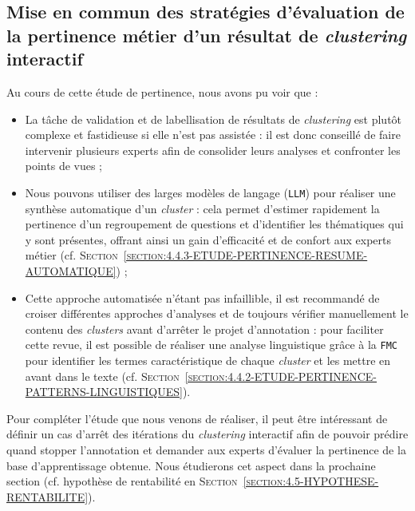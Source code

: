 		
	\subsection{Mise en commun des stratégies d'évaluation de la pertinence métier d'un résultat de \textit{clustering} interactif}
	\label{section:4.4.4-ETUDE-PERTINENCE-MISE-EN-COMMUN}
			
		\begin{leftBarSummary}
			Au cours de cette étude de pertinence, nous avons pu voir que :
			\begin{itemize}
				\item[\itemok] La tâche de validation et de labellisation de résultats de \textit{clustering} est plutôt complexe et fastidieuse si elle n'est pas assistée : il est donc conseillé de faire intervenir plusieurs experts afin de consolider leurs analyses et confronter les points de vues ;
				\item[\itemok] Nous pouvons utiliser des larges modèles de langage (\texttt{LLM}) pour réaliser une synthèse automatique d'un \textit{cluster} : cela permet d'estimer rapidement la pertinence d'un regroupement de questions et d'identifier les thématiques qui y sont présentes, offrant ainsi un gain d'efficacité et de confort aux experts métier (cf. \textsc{Section~\ref{section:4.4.3-ETUDE-PERTINENCE-RESUME-AUTOMATIQUE}}) ;
				\item[\itemok] Cette approche automatisée n'étant pas infaillible, il est recommandé de croiser différentes approches d'analyses et de toujours vérifier manuellement le contenu des \textit{clusters} avant d'arrêter le projet d'annotation : pour faciliter cette revue, il est possible de réaliser une analyse linguistique grâce à la \texttt{FMC} pour identifier les termes caractéristique de chaque \textit{cluster} et les mettre en avant dans le texte (cf. \textsc{Section~\ref{section:4.4.2-ETUDE-PERTINENCE-PATTERNS-LINGUISTIQUES}}).
			\end{itemize}
		\end{leftBarSummary}
		
		Pour compléter l'étude que nous venons de réaliser, il peut être intéressant de définir un cas d'arrêt des itérations du \textit{clustering} interactif afin de pouvoir prédire quand stopper l'annotation et demander aux experts d'évaluer la pertinence de la base d'apprentissage obtenue.
		Nous étudierons cet aspect dans la prochaine section (cf. hypothèse de rentabilité en \textsc{Section~\ref{section:4.5-HYPOTHESE-RENTABILITE}}).
		